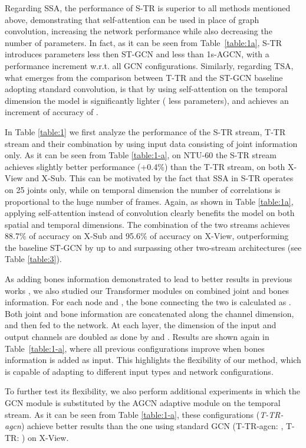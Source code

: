 \documentclass[review]{cvpr}
\begin{document}
\setlength{\tabcolsep}{1.4pt}

Regarding SSA, the performance of S-TR is superior to all methods mentioned above, demonstrating that self-attention can be used in place of graph convolution, increasing the network performance while also decreasing the number of parameters. 
In fact, as it can be seen from Table~\ref{table:1a}, S-TR introduces  parameters less then ST-GCN and  less than 1s-AGCN, with a performance increment w.r.t. all GCN configurations. Similarly, regarding TSA, what emerges from the comparison between T-TR and the ST-GCN baseline adopting standard convolution, is that by using self-attention on the temporal dimension the model is significantly lighter ( less parameters), and achieves an increment of accuracy of . 


In Table \ref{table:1} we first analyze the performance of the S-TR stream, T-TR stream and their combination by using input data consisting of joint information only. As it can be seen from Table \ref{table:1-a}, on NTU-60 the S-TR stream achieves slightly better performance (+0.4\%) than the T-TR stream, on both X-View and X-Sub. This can be motivated by the fact that SSA in S-TR operates on 25 joints only, while on temporal dimension the number of correlations is proportional to the huge number of frames. Again, as shown in Table \ref{table:1a}, applying self-attention instead of convolution clearly benefits the model on both spatial and temporal dimensions. The combination of the two streams achieves 88.7\% of accuracy on X-Sub and 95.6\% of accuracy on X-View,  outperforming the baseline ST-GCN by up to  and surpassing other two-stream architectures (see Table \ref{table:3}).


As adding bones information demonstrated to lead to better results in previous works \cite{dirgraph,2s-cnn}, we also studied our Transformer modules on combined joint and bones information. For each node  and , the bone connecting the two is calculated as 
    .
Both joint and bone information are concatenated along the channel dimension, and then fed to the network. At each layer, the dimension of the input and output channels are doubled as done by \cite{dirgraph} and \cite{2s-cnn}. Results are shown again in Table~\ref{table:1-a}, where all previous configurations improve when bones information is added as input. This highlights the flexibility of our method, which is capable of adapting to different input types and network configurations. 

To further test its flexibility, we also perform additional experiments in which the GCN module is substituted by the AGCN adaptive module on the temporal stream. As it can be seen from Table \ref{table:1-a}, these configurations (\textit{T-TR-agcn}) achieve better results than the one using standard GCN (T-TR-agcn: , T-TR: ) on X-View.
\end{document}
